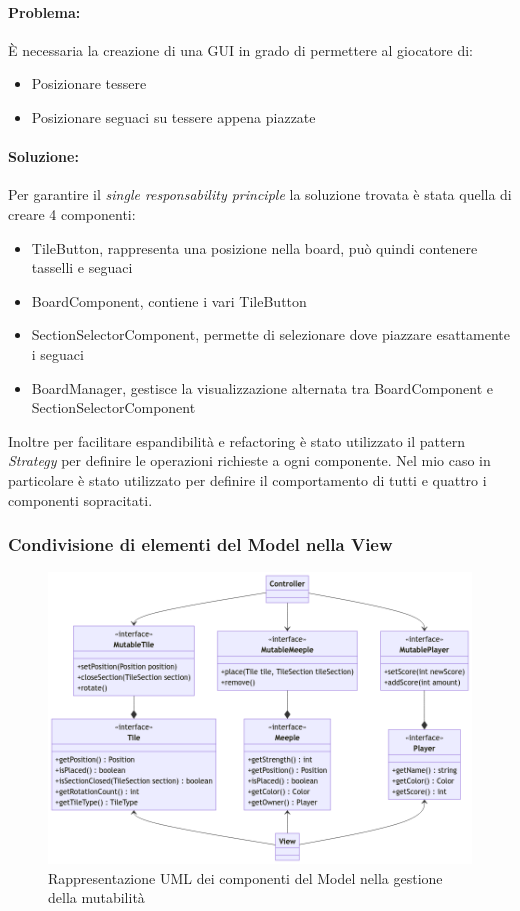 \paragraph{Problema:}
È necessaria la creazione di una GUI in grado di permettere al giocatore di:
\begin{itemize}
    \item Posizionare tessere
    \item Posizionare seguaci su tessere appena piazzate
\end{itemize}
\paragraph{Soluzione:}
Per garantire il \textit{single responsability principle} la soluzione trovata è stata quella di creare 4 componenti:
\begin{itemize}
    \item TileButton, rappresenta una posizione nella board, può quindi contenere tasselli e seguaci
    \item BoardComponent, contiene i vari TileButton
    \item SectionSelectorComponent, permette di selezionare dove piazzare esattamente i seguaci
    \item BoardManager, gestisce la visualizzazione alternata tra BoardComponent e SectionSelectorComponent
\end{itemize}
Inoltre per facilitare espandibilità e refactoring è stato utilizzato il pattern \textit{Strategy} per definire le operazioni richieste a ogni componente. Nel mio caso in particolare è stato utilizzato per definire il comportamento di tutti e quattro i componenti sopracitati.

\subsubsection*{Condivisione di elementi del Model nella View}
\begin{figure}[h]
    \centering\includegraphics[scale=.4]{images/uml_mutability.png}
    \caption{Rappresentazione UML dei componenti del Model nella gestione della mutabilità}
\end{figure}
